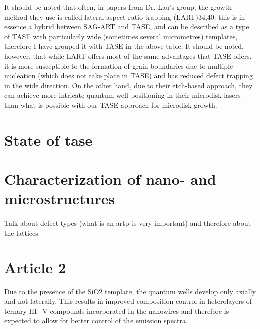 It should be noted that often, in papers from Dr. Lau’s group, the growth method they use is called lateral aspect ratio trapping (LART)34,40: this is in essence a hybrid between SAG-ART and TASE, and can be described as a type of TASE with particularly wide (sometimes several micrometres) templates, therefore I have grouped it with TASE in the above table. It should be noted, however, that while LART offers most of the same advantages that TASE offers, it is more susceptible to the formation of grain boundaries due to multiple nucleation (which does not take place in TASE) and has reduced defect trapping in the wide direction. On the other hand, due to their etch-based approach, they can achieve more intricate quantum well positioning in their microdisk lasers than what is possible with our TASE approach for microdisk growth.

\section{\texorpdfstring{State of \acl{tase}}{State of template assisted selective epitaxy}}
\section{Characterization of nano- and microstructures}
Talk about defect types (what is an artp is very important) and therefore about the lattices

\section{Article 2}

Due to the presence of the SiO2 template, the quantum wells
develop only axially and not laterally. This results in improved
composition control in heterolayers of ternary III−V
compounds incorporated in the nanowires\cite{Borg2019} and therefore is
expected to allow for better control of the emission spectra.